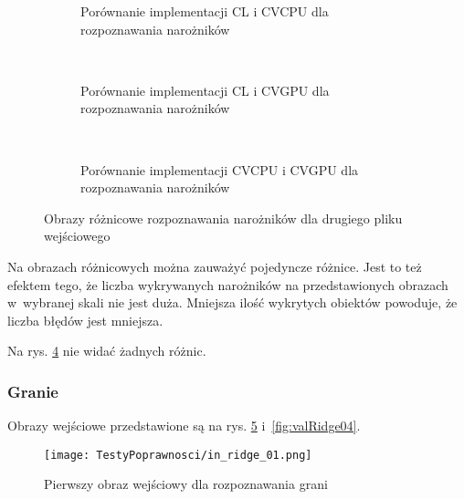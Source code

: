 \begin{figure}[h]
\begin{subfigure}[t]{0.3\textwidth}
	\centering
	\setlength\fboxsep{0pt}
	\setlength\fboxrule{0.5pt}
	\caption{Porównanie implementacji CL i CVCPU dla rozpoznawania narożników}
	\label{fig:valCorner2CLCVCPU}
\end{subfigure}
~
\begin{subfigure}[t]{0.3\textwidth}
	\centering
	\setlength\fboxsep{0pt}
	\setlength\fboxrule{0.5pt}
	\caption{Porównanie implementacji CL i CVGPU dla rozpoznawania narożników}
	\label{fig:valCorner2CLCVGPU}
\end{subfigure}
~
\begin{subfigure}[t]{0.3\textwidth}
	\centering
	\setlength\fboxsep{0pt}
	\setlength\fboxrule{0.5pt}
	\caption{Porównanie implementacji CVCPU i CVGPU dla rozpoznawania narożników}
	\label{fig:valCorner2CVCPUCVGPU}                 
\end{subfigure}
\caption{Obrazy różnicowe rozpoznawania narożników dla drugiego pliku wejściowego}

\label{fig:valCorner2}
\end{figure}

Na obrazach różnicowych można zauważyć pojedyncze różnice. Jest to też efektem tego, że liczba wykrywanych narożników na przedstawionych obrazach w~wybranej skali nie jest duża. Mniejsza ilość wykrytych obiektów powoduje, że liczba błędów jest mniejsza.

Na rys. \ref{fig:valCorner2} nie widać żadnych różnic.

\subsubsection{Granie}
\label{subsubsec:granieRysunki}

Obrazy wejściowe przedstawione są na rys. \ref{fig:valRidge01} i~\ref{fig:valRidge04}.

\begin{figure}[h]
\begin{center}
\texttt{[image: TestyPoprawnosci/in\_ridge\_01.png]}
\end{center}
\caption{Pierwszy obraz wejściowy dla rozpoznawania grani}
\label{fig:valRidge01}
\end{figure}


